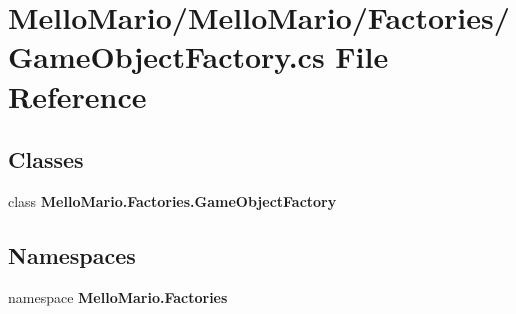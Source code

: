 \section{Mello\+Mario/\+Mello\+Mario/\+Factories/\+Game\+Object\+Factory.cs File Reference}
\label{GameObjectFactory_8cs}
\subsection*{Classes}
\begin{DoxyCompactItemize}
\item 
class \textbf{ Mello\+Mario.\+Factories.\+Game\+Object\+Factory}
\end{DoxyCompactItemize}
\subsection*{Namespaces}
\begin{DoxyCompactItemize}
\item 
namespace \textbf{ Mello\+Mario.\+Factories}
\end{DoxyCompactItemize}
